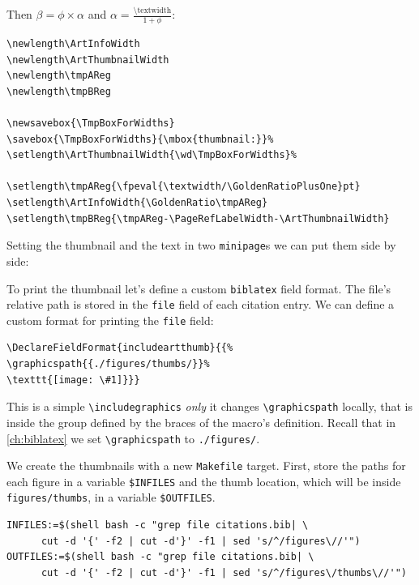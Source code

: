 \documentclass[12pt,a4,oneside,usenames,dvipsnames]{book}
\newcommand\biblatex{\texttt{biblatex}\xspace}%
\begin{document}
Then $β=\phi\times{}α$ and $α=\frac{\text{\textbackslash{}textwidth}}{1+\phi{}}$:

\begin{verbatim}
\newlength\ArtInfoWidth
\newlength\ArtThumbnailWidth
\newlength\tmpAReg
\newlength\tmpBReg

\newsavebox{\TmpBoxForWidths}
\savebox{\TmpBoxForWidths}{\mbox{thumbnail:}}%
\setlength\ArtThumbnailWidth{\wd\TmpBoxForWidths}%

\setlength\tmpAReg{\fpeval{\textwidth/\GoldenRatioPlusOne}pt}
\setlength\ArtInfoWidth{\GoldenRatio\tmpAReg}
\setlength\tmpBReg{\tmpAReg-\PageRefLabelWidth-\ArtThumbnailWidth}
\end{verbatim}

Setting the thumbnail and the text in two \texttt{minipage}s we can put
them side by side:

\begin{figure}
{\centering%
%
\skelcaption[width=0.2\textwidth,lines=1]{}}
\end{figure}

To print the thumbnail let's define a custom \biblatex field
format. The file's relative path is stored in the \texttt{file} field of
each citation entry. We can define a custom format for printing the
\texttt{file} field:

\begin{verbatim}
\DeclareFieldFormat{includeartthumb}{{%
\graphicspath{{./figures/thumbs/}}%
\texttt{[image: \#1]}}}
\end{verbatim}

This is a simple \texttt{\textbackslash{}includegraphics} \emph{only} it changes
\texttt{\textbackslash{}graphicspath} locally, that is inside the group
defined by the braces of the macro's definition. Recall that in
\autoref{ch:biblatex} we set \texttt{\textbackslash{}graphicspath} to
\texttt{./figures/}.

We create the thumbnails with a new \texttt{Makefile} target. First,
store the paths for each figure in a variable \texttt{\$INFILES} and the
thumb location, which will be inside \texttt{figures/thumbs}, in a
variable \texttt{\$OUTFILES}.

\begin{verbatim}
INFILES:=$(shell bash -c "grep file citations.bib| \
      cut -d '{' -f2 | cut -d'}' -f1 | sed 's/^/figures\//'")
OUTFILES:=$(shell bash -c "grep file citations.bib| \
      cut -d '{' -f2 | cut -d'}' -f1 | sed 's/^/figures\/thumbs\//'")
\end{verbatim}
\end{document}
